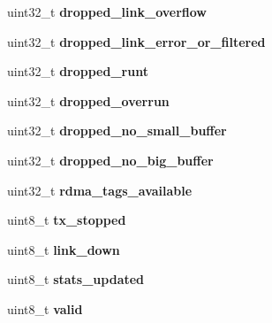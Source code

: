 \begin{DoxyCompactItemize}
\item 
\hypertarget{structmcp__irq__data_ad85577eba779ad4e468f1c089d69414e}{
uint32\_\-t {\bfseries dropped\_\-link\_\-overflow}}
\label{structmcp__irq__data_ad85577eba779ad4e468f1c089d69414e}

\item 
\hypertarget{structmcp__irq__data_a43a3b2d37107a6b2462a18a56ade9527}{
uint32\_\-t {\bfseries dropped\_\-link\_\-error\_\-or\_\-filtered}}
\label{structmcp__irq__data_a43a3b2d37107a6b2462a18a56ade9527}

\item 
\hypertarget{structmcp__irq__data_afa8d98883fa69810d4d15510e4665321}{
uint32\_\-t {\bfseries dropped\_\-runt}}
\label{structmcp__irq__data_afa8d98883fa69810d4d15510e4665321}

\item 
\hypertarget{structmcp__irq__data_ab86493ad4226c40f7db55ce7e8b2ef0d}{
uint32\_\-t {\bfseries dropped\_\-overrun}}
\label{structmcp__irq__data_ab86493ad4226c40f7db55ce7e8b2ef0d}

\item 
\hypertarget{structmcp__irq__data_a0ec9725dbc469879ddf28fda2f4f02b1}{
uint32\_\-t {\bfseries dropped\_\-no\_\-small\_\-buffer}}
\label{structmcp__irq__data_a0ec9725dbc469879ddf28fda2f4f02b1}

\item 
\hypertarget{structmcp__irq__data_a5a020eef4f7dbf1cec388e7fe423e82c}{
uint32\_\-t {\bfseries dropped\_\-no\_\-big\_\-buffer}}
\label{structmcp__irq__data_a5a020eef4f7dbf1cec388e7fe423e82c}

\item 
\hypertarget{structmcp__irq__data_ad8edc877922b5397a96459e0c8c39e31}{
uint32\_\-t {\bfseries rdma\_\-tags\_\-available}}
\label{structmcp__irq__data_ad8edc877922b5397a96459e0c8c39e31}

\item 
\hypertarget{structmcp__irq__data_a513bbac2846985fa5517224fb4ef518e}{
uint8\_\-t {\bfseries tx\_\-stopped}}
\label{structmcp__irq__data_a513bbac2846985fa5517224fb4ef518e}

\item 
\hypertarget{structmcp__irq__data_a166436fc5c996d0eecbba64a068b25ea}{
uint8\_\-t {\bfseries link\_\-down}}
\label{structmcp__irq__data_a166436fc5c996d0eecbba64a068b25ea}

\item 
\hypertarget{structmcp__irq__data_a3a17d05320568aab2e01fe26f7cc2477}{
uint8\_\-t {\bfseries stats\_\-updated}}
\label{structmcp__irq__data_a3a17d05320568aab2e01fe26f7cc2477}

\item 
\hypertarget{structmcp__irq__data_a1c47a3d139a70e2da203a93731d68cd8}{
uint8\_\-t {\bfseries valid}}
\label{structmcp__irq__data_a1c47a3d139a70e2da203a93731d68cd8}

\end{DoxyCompactItemize}


